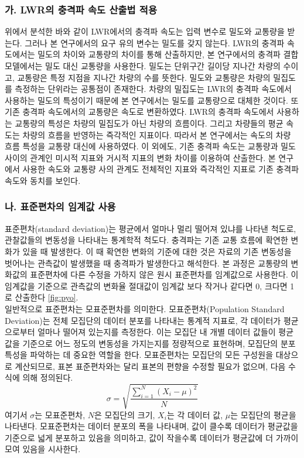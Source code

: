 \documentclass[11pt]{report}
\begin{document}
\subsubsection*{가. LWR의 충격파 속도 산출법 적용}
위에서 분석한 바와 같이 LWR에서의 충격파 속도는 입력 변수로 밀도와 교통량을 받는다. 
그러나 본 연구에서의 요구 유의 변수는 밀도를 갖지 않는다. 
LWR의 충격파 속도에서는 밀도의 차이와 교통량의 차이를 통해 산출하지만, 
본 연구에서의 충격파 결합 모델에서는 밀도 대신 교통량을 사용한다. 
밀도는 단위구간 길이당 지나간 차량의 수이고, 교통량은 특정 지점을 지나간 차량의 수를 뜻한다. 
밀도와 교통량은 차량의 밀집도를 측정하는 단위라는 공통점이 존재한다. 
차량의 밀집도는 LWR의 충격파 속도에서 사용하는 밀도의 특성이기 때문에 본 연구에서는 밀도를 교통량으로 대체한 것이다. 
또 기존 충격파 속도에서의 교통량은 속도로 변환하였다. 
LWR의 충격파 속도에서 사용하는 교통량의 특성은 차량의 밀집도가 아닌 차량의 흐름이다. 
그리고 차량들의 평균 속도는 차량의 흐름을 반영하는 즉각적인 지표이다. 
따라서 본 연구에서는 속도의 차량 흐름 특성을 교통량 대신에 사용하였다. 
이 외에도, 기존 충격파 속도는 교통량과 밀도 사이의 관계인 미시적 지표와 거시적 지표의 변화 차이를 이용하여 산출한다. 
본 연구에서 사용한 속도와 교통량 사의 관계도 전체적인 지표와 즉각적인 지표로 기존 충격파 속도와 동치를 보인다. 
\subsubsection*{나. 표준편차의 임계값 사용}
표준편차(standard deviation)는 평균에서 얼마나 멀리 떨어져 있냐를 나타낸 척도로, 관찰값들의 변동성을 나타내는 통계학적 척도다. 
충격파는 기존 교통 흐름에 확연한 변화가 있을 때 발생한다. 
이 때 확연한 변화의 기준에 대한 것은 자료의 기존 변동성을 벗어나는 관측값이 발생했을 때 충격파가 발생한다고 해석한다. 
본 과정은 교통량의 변화값의 표준편차에 다른 수정을 가하지 않은 원시 표준편차를 임계값으로 사용한다. 
이 임계값을 기준으로 관측값의 변화율 절대값이 임계값 보다 작거나 같다면 0, 크다면 1로 산출한다 \autoref{fig:pyo}. \\
\indent 일반적으로 표준편차는 모표준편차를 의미한다. 
모표준편차(Population Standard Deviation)는 전체 모집단의 데이터 분포를 나타내는 통계적 지표로, 각 데이터가 평균으로부터 얼마나 떨어져 있는지를 측정한다. 
이는 모집단 내 개별 데이터 값들이 평균값을 기준으로 어느 정도의 변동성을 가지는지를 정량적으로 표현하며, 모집단의 분포 특성을 파악하는 데 중요한 역할을 한다. 
모표준편차는 모집단의 모든 구성원을 대상으로 계산되므로, 표본 표준편차와는 달리 표본의 편향을 수정할 필요가 없으며, 다음 수식에 의해 정의된다.
$$
\sigma = \sqrt{\frac{\sum_{i=1}^{N} (X_i - \mu)^2}{N}}
$$
여기서 \( \sigma \)는 모표준편차, \( N \)은 모집단의 크기, \( X_i \)는 각 데이터 값, \( \mu \)는 모집단의 평균을 나타낸다. 
모표준편차는 데이터 분포의 폭을 나타내며, 값이 클수록 데이터가 평균값을 기준으로 넓게 분포하고 있음을 의미하고, 값이 작을수록 데이터가 평균값에 더 가까이 모여 있음을 시사한다. 
\end{document}
